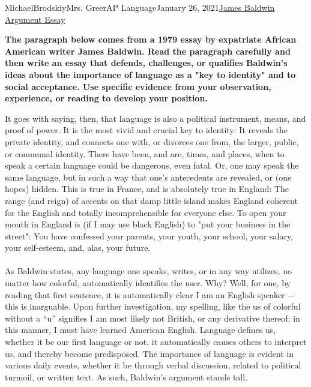 \documentclass[12pt,letterpaper]{article}
\begin{document}
\begin{mla}{Michael}{Brodskiy}{Mrs. Greer}{AP Language}{January 26, 2021}{\underline{James Baldwin Argument Essay}} 

  \begin{justify}
    \textbf{The paragraph below comes from a 1979 essay by expatriate African American writer James Baldwin. Read the paragraph carefully and then write an essay that defends, challenges, or qualifies Baldwin's ideas about the importance of language as a "key to identity" and to social acceptance. Use specific evidence from your observation, experience, or reading to develop your position.}\\
  \end{justify}

  \begin{justify}
It goes with saying, then, that language is also a political instrument, means, and proof of power. It is the most vivid and crucial key to identity: It reveals the private identity, and connects one with, or divorces one from, the larger, public, or communal identity. There have been, and are, times, and places, when to speak a certain language could be dangerous, even fatal. Or, one may speak the same language, but in such a way that one's antecedents are revealed, or (one hopes) hidden. This is true in France, and is absolutely true in England: The range (and reign) of accents on that damp little island makes England coherent for the English and totally incomprehensible for everyone else. To open your mouth in England is (if I may use black English) to "put your business in the street": You have confessed your parents, your youth, your school, your salary, your self-esteem, and, alas, your future.
  \end{justify}

    \paragraph{} As Baldwin states, any language one speaks, writes, or in any way utilizes, no matter how colorful, automatically identifies the user. Why? Well, for one, by reading that first sentence, it is automatically clear I am an English speaker $-$ this is inarguable. Upon further investigation, my spelling, like the us of colorful without a ``u'' signifies I am most likely not British, or any derivative thereof; in this manner, I must have learned American English. Language defines us, whether it be our first language or not, it automatically causes others to interpret us, and thereby become predisposed. The importance of language is evident in various daily events, whether it be through verbal discussion, related to political turmoil, or written text. As such, Baldwin's argument stands tall.  \\


\end{mla}
\end{document}
